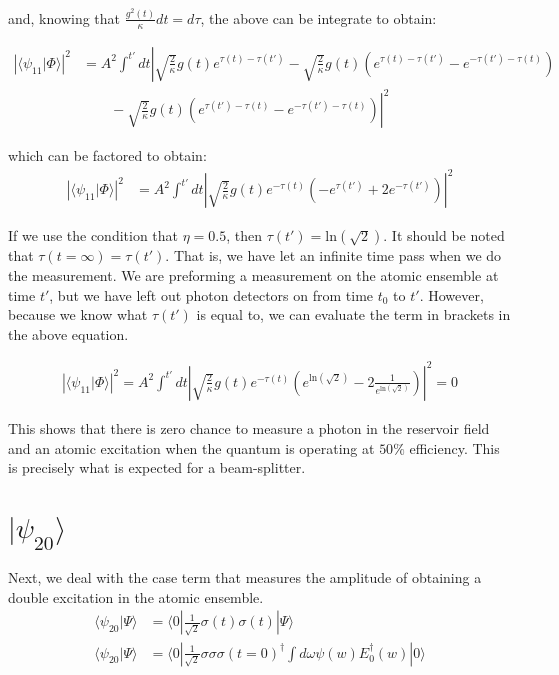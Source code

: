 \documentclass[12pt]{article}
\begin{document}
and, knowing that $\frac{g^2(t)}{\kappa}dt = d\tau$, the above can be integrate to obtain:

\begin{align}
\left | \langle \psi_{11} | \Phi \rangle \right | ^2 &=A^2\int^{t'} dt \left| \sqrt{\frac{2}{\kappa}} g(t) e^{\tau(t)-\tau(t')} - \sqrt{\frac{2}{\kappa}} g(t)\left( e^{\tau(t)-\tau(t')} - e^{-\tau(t')-\tau(t)} \right )\right.\\
&\left. \qquad -\sqrt{\frac{2}{\kappa}} g(t) \left( e^{\tau(t')-\tau(t)} - e^{-\tau(t')-\tau(t)} \right)\right|^2 
\end{align}

which can be factored to obtain:
\begin{align}
\label{p11}
\left | \langle \psi_{11} | \Phi \rangle \right | ^2  &= A^2\int^{t'} dt \left|\sqrt{\frac{2}{\kappa}} g(t) e^{-\tau(t)} \left (- e^{\tau(t')} +2 e^{-\tau(t')} \right ) \right |^2 
\end{align}

If we use the condition that $\eta=0.5$, then $\tau(t') = \textrm{ln}(\sqrt{2})$. It should be noted that $\tau(t=\infty) = \tau(t')$. That is, we have let an infinite time pass when we do the measurement. We are preforming a measurement on the atomic ensemble at time $t'$, but we have left out photon detectors on from time $t_0$ to $t'$. However, because we know what $\tau(t')$ is equal to, we can evaluate the term in brackets in the above equation.

\begin{align}
\left | \langle \psi_{11} | \Phi \rangle \right | ^2 = A^2\int^{t'} dt \left| \sqrt{\frac{2}{\kappa}} g(t) e^{-\tau(t)} \left ( e^{\textrm{ln}(\sqrt{2})} -2 \frac{1}{e^{\textrm{ln}({\sqrt{2}})}} \right ) \right|^2 = 0 
\end{align}

This shows that there is zero chance to measure a photon in the reservoir field and an atomic excitation when the quantum is operating at $50\%$ efficiency. This is precisely what is expected for a beam-splitter.


\section{ $| \psi_{20} \rangle$}
Next, we deal with the case term that measures the amplitude of obtaining a double excitation in the atomic ensemble.
\begin{align}
\langle \psi_{20}| \Psi \rangle &=\langle 0 |\frac{1}{\sqrt{2}} \sigma(t)\sigma (t)| \Psi \rangle\\
\langle \psi_{20}| \Psi \rangle &=\langle 0 | \frac{1}{\sqrt{2}} \sigma \sigma 
\sigma(t=0)^\dagger \int d\omega \psi(w) E_0^\dagger(w) | 0 \rangle
\end{align}
\end{document}

